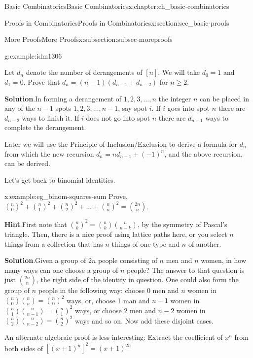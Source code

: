 \documentclass[oneside,10pt,]{book}
\numberwithin{equation}{chapter}
\begin{document}
\begin{chapterptx}{Basic Combinatorics}{}{Basic Combinatorics}{}{}{x:chapter:ch_basic-combinatorics}
\begin{sectionptx}{Proofs in Combinatorics}{}{Proofs in Combinatorics}{}{}{x:section:sec_basic-proofs}
\begin{subsectionptx}{More Proofs}{}{More Proofs}{}{}{x:subsection:subsec-moreproofs}
\begin{example}{}{g:example:idm1306}
\par
Let \(d_{n}\) denote the number of derangements of \([n]\).  We will take \(d_{0} = 1\) and \(d_{1} = 0\).  Prove that \(d_{n} = (n - 1)(d_{n - 1}+ d_{n - 2})\) for \(n \geq 2\).%
\par\smallskip%
\noindent\textbf{Solution}.\hypertarget{g:solution:idm1321}{}\quad{}In forming a derangement of \(1, 2, 3, \ldots, n\) the integer \(n\) can be placed in any of the \(n - 1\) spots \(1, 2, 3, \ldots, n - 1\), say spot \(i\). If \(i\) goes into spot \(n\) there are \(d_{n - 2}\) ways to finish it. If \(i\) does not go into spot \(n\) there are \(d_{n - 1}\) ways to complete the derangement.%
\end{example}
Later we will use the Principle of Inclusion\slash{}Exclusion to derive a formula for \(d_{n}\) from which the new recursion \(d_{n} = nd_{n - 1} + \left( - 1 \right)^{n}\), and the above recursion, can be derived.%
\par
Let's get back to binomial identities.%
\begin{example}{}{x:example:eg_binom-squares-sum}%
Prove, \(\binom{n}{0}^{2} + \binom{n}{1}^{2} + \binom{n}{2}^{2} + \ldots + \binom{n}{n}^{2} = \binom{2n}{n}\).%
\par\smallskip%
\noindent\textbf{Hint}.\hypertarget{g:hint:idm1342}{}\quad{}First note that \(\binom{n}{k}^2 = \binom{n}{k}\binom{n}{n-k}\), by the symmetry of Pascal's triangle.  Then, there is a nice proof using lattice paths here, or you select \(n\) things from a collection that has \(n\) things of one type and \(n\) of another.%
\par\smallskip%
\noindent\textbf{Solution}.\hypertarget{g:solution:idm1348}{}\quad{}Given a group of \(2n\) people consisting of \(n\) men and \(n\) women, in how many ways can one choose a group of \(n\) people? The answer to that question is just \(\binom{2n}{n}\), the right side of the identity in question. One could also form the group of \(n\) people in the following way: choose 0 men and \(n\) women in \(\binom{n}{0} \binom{n}{n} = \binom{n}{0}^{2}\) ways, or, choose 1 man and \(n - 1\) women in \(\binom{n}{1} \binom{n}{n - 1} = \binom{n}{1}^{2}\) ways, or choose 2 men and \(n - 2\) women in \(\binom{n}{2} \binom{n}{n - 2} = \binom{n}{2}^{2}\) ways and so on. Now add these disjoint cases.%
\par
An alternate algebraic proof is less interesting: Extract the coefficient of \(x^{n}\) from both sides of \(\left\lbrack \left( x + 1 \right)^{n} \right\rbrack^{2} = \left(x + 1 \right)^{2n}\)%
\end{example}

\end{subsectionptx}
\end{sectionptx}
\end{chapterptx}
\end{document}
